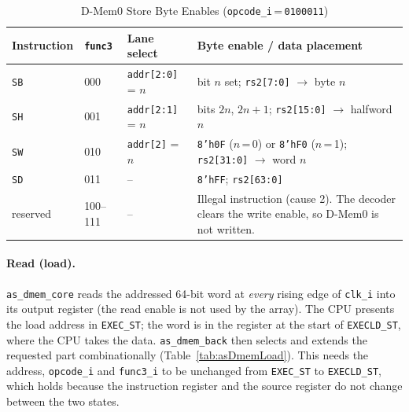 \begin{table}[H]
\caption{D-Mem0 Store Byte Enables (\texttt{opcode\_i}\,=\,\texttt{0100011})}
\label{tab:asDmemStore}
\centering
\begin{tabularx}{\textwidth}{|l |l |l |X|}
  \hline
  Instruction & \texttt{func3} & Lane select & Byte enable / data placement \\
  \hline
  \hline
  \texttt{SB} & 000 & \texttt{addr[2:0]} = $n$ & bit $n$ set; \texttt{rs2[7:0]} $\rightarrow$ byte $n$ \\
  \hline
  \texttt{SH} & 001 & \texttt{addr[2:1]} = $n$ & bits $2n$, $2n{+}1$; \texttt{rs2[15:0]} $\rightarrow$ halfword $n$ \\
  \hline
  \texttt{SW} & 010 & \texttt{addr[2]} = $n$   & \texttt{8'h0F} ($n$\,=\,0) or \texttt{8'hF0} ($n$\,=\,1);
                       \texttt{rs2[31:0]} $\rightarrow$ word $n$ \\
  \hline
  \texttt{SD} & 011 & --                       & \texttt{8'hFF}; \texttt{rs2[63:0]} \\
  \hline
  reserved & 100--111 & -- & Illegal instruction (cause 2). The decoder clears the
                       write enable, so D-Mem0 is not written. \\
  \hline
\end{tabularx}
\end{table}

\paragraph{Read (load).}
\texttt{as\_dmem\_core} reads the addressed 64-bit word at \emph{every} rising
edge of \texttt{clk\_i} into its output register (the read enable is not used
by the array). The CPU presents the load address in \texttt{EXEC\_ST}; the word
is in the register at the start of \texttt{EXECLD\_ST}, where the CPU takes the
data. \texttt{as\_dmem\_back} then selects and extends the requested part
combinationally (Table~\ref{tab:asDmemLoad}). This needs the address,
\texttt{opcode\_i} and \texttt{func3\_i} to be unchanged from \texttt{EXEC\_ST}
to \texttt{EXECLD\_ST}, which holds because the instruction register and the
source register do not change between the two states.

